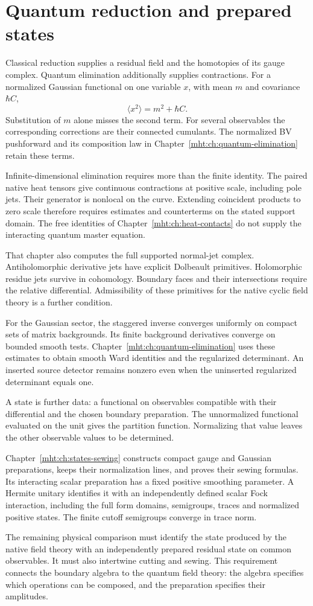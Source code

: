\section{Quantum reduction and prepared states}

Classical reduction supplies a residual field and the homotopies of
its gauge complex. Quantum elimination additionally supplies
contractions. For a normalized Gaussian functional on one variable $x$,
with mean $m$ and covariance $\hbar C$,
\[
 \langle x^2\rangle=m^2+\hbar C.
\]
Substitution of $m$ alone misses the second term. For several
observables the corresponding corrections are their connected
cumulants. The normalized BV pushforward and its composition law in
Chapter~\ref{mht:ch:quantum-elimination} retain these terms.

Infinite-dimensional elimination requires more than the finite
identity. The paired native heat tensors give continuous contractions
at positive scale, including pole jets. Their generator is nonlocal
on the curve. Extending coincident products to zero scale therefore
requires estimates and counterterms on the stated support domain.
The free identities of Chapter~\ref{mht:ch:heat-contacts} do not supply
the interacting quantum master equation.

That chapter also computes the full supported normal-jet complex.
Antiholomorphic derivative jets have explicit Dolbeault primitives.
Holomorphic residue jets survive in cohomology. Boundary faces and
their intersections require the relative differential. Admissibility
of these primitives for the native cyclic field theory is a further
condition.

For the Gaussian sector, the staggered inverse converges uniformly on
compact sets of matrix backgrounds. Its finite background derivatives
converge on bounded smooth tests. Chapter~\ref{mht:ch:quantum-elimination}
uses these estimates to obtain smooth Ward identities and the
regularized determinant. An inserted source detector remains nonzero
even when the uninserted regularized determinant equals one.

A state is further data: a functional on observables compatible with
their differential and the chosen boundary preparation.
The unnormalized functional evaluated on the unit gives the partition
function. Normalizing that value leaves the other observable values
to be determined.

Chapter~\ref{mht:ch:states-sewing} constructs compact
gauge and Gaussian preparations, keeps their normalization lines,
and proves their sewing formulas. Its interacting scalar preparation
has a fixed positive smoothing parameter. A Hermite unitary identifies
it with an independently defined scalar Fock interaction, including
the full form domains, semigroups, traces and normalized positive
states. The finite cutoff semigroups converge in trace norm.

The remaining physical comparison must identify the state produced by
the native field theory with an independently prepared residual state
on common observables. It must also intertwine cutting and sewing.
This requirement connects the boundary algebra to the quantum field
theory: the algebra specifies which operations can be composed, and
the preparation specifies their amplitudes.
